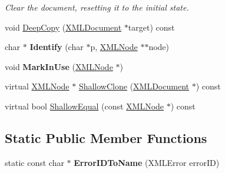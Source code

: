 \begin{DoxyCompactItemize}
\begin{DoxyCompactList}\small\item\em Clear the document, resetting it to the initial state. \end{DoxyCompactList}\item 
void \hyperlink{classtinyxml2_1_1XMLDocument_a341e6d8c97c0c2b5d96a5f355c09c665}{Deep\+Copy} (\hyperlink{classtinyxml2_1_1XMLDocument}{X\+M\+L\+Document} $\ast$target) const 
\item 
char $\ast$ {\bfseries Identify} (char $\ast$p, \hyperlink{classtinyxml2_1_1XMLNode}{X\+M\+L\+Node} $\ast$$\ast$node)\hypertarget{classtinyxml2_1_1XMLDocument_a25827d1bec509ad566a107e5853ed040}{}\label{classtinyxml2_1_1XMLDocument_a25827d1bec509ad566a107e5853ed040}

\item 
void {\bfseries Mark\+In\+Use} (\hyperlink{classtinyxml2_1_1XMLNode}{X\+M\+L\+Node} $\ast$)\hypertarget{classtinyxml2_1_1XMLDocument_a95d28ecb4760a994556b0a51690b21be}{}\label{classtinyxml2_1_1XMLDocument_a95d28ecb4760a994556b0a51690b21be}

\item 
virtual \hyperlink{classtinyxml2_1_1XMLNode}{X\+M\+L\+Node} $\ast$ \hyperlink{classtinyxml2_1_1XMLDocument_a57c8511ed9f83aa3e20909a3db3f83d0}{Shallow\+Clone} (\hyperlink{classtinyxml2_1_1XMLDocument}{X\+M\+L\+Document} $\ast$) const 
\item 
virtual bool \hyperlink{classtinyxml2_1_1XMLDocument_a12eac66c6e45d074d5cc47319868cd66}{Shallow\+Equal} (const \hyperlink{classtinyxml2_1_1XMLNode}{X\+M\+L\+Node} $\ast$) const 
\end{DoxyCompactItemize}
\subsection*{Static Public Member Functions}
\begin{DoxyCompactItemize}
\item 
static const char $\ast$ {\bfseries Error\+I\+D\+To\+Name} (X\+M\+L\+Error error\+ID)\hypertarget{classtinyxml2_1_1XMLDocument_a639f7c295c38dc5a4aafeb2fff93da03}{}\label{classtinyxml2_1_1XMLDocument_a639f7c295c38dc5a4aafeb2fff93da03}

\end{DoxyCompactItemize}
